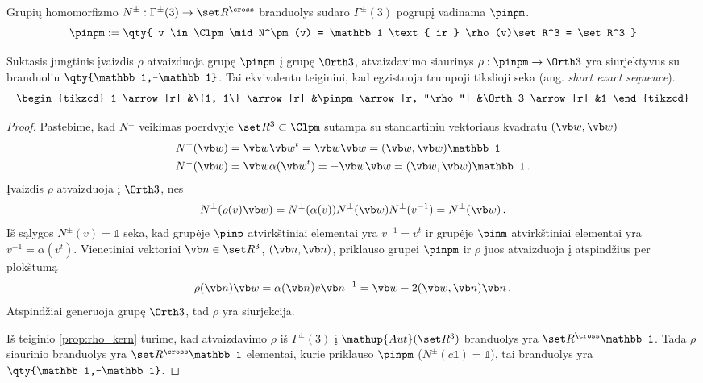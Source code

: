 \begin{definition}
	Grupių homomorfizmo $N^\pm:\Gamma^\pm(3) \to \set R^{\cross}$
	branduolys sudaro $\Gamma^\pm(3)$ pogrupį vadinama $\pinpm$.
	\begin{equation}
		\pinpm := \qty{
			v \in \Clpm 
			\mid 
			N^\pm(v) = \mathbb1
			\text{ ir }
			\rho(v)\set R^3 = \set R^3
		}
	\end{equation}
\end{definition}



\begin{proposition}
	\label{prop:pin_sequence}
	Suktasis jungtinis įvaizdis $\rho$ atvaizduoja grupę $\pinpm$ į grupę $\Orth3$,
	atvaizdavimo siaurinys $\rho:\pinpm\to\Orth3$ yra siurjektyvus
	su branduoliu $\qty{\mathbb1,-\mathbb1}$.
	Tai ekvivalentu teiginiui, kad egzistuoja trumpoji tikslioji seka
	(ang. \emph{short exact sequence}).
	\begin{equation}
		\begin{tikzcd}
			1 \arrow[r] &\{1,-1\} \arrow[r]	&\pinpm \arrow[r, "\rho"] &\Orth3 \arrow[r] &1
		\end{tikzcd}
	\end{equation}
\end{proposition}
\begin{proof}
	Pastebime, kad $N^\pm$ veikimas poerdvyje $\set R^3 \subset \Clpm$
	sutampa su standartiniu vektoriaus kvadratu $(\vb w, \vb w)$
	\begin{align}
		N^+ (\vb w) &= \vb w {\vb w}^t 
		= \vb w \vb w = (\vb w,\vb w)\mathbb1
		\\
		N^- (\vb w) &= \vb w \alpha({\vb w}^t) 
		= -\vb w \vb w = (\vb w,\vb w)\mathbb1
		\,.
	\end{align}
	Įvaizdis $\rho$ atvaizduoja į $\Orth3$, nes
	\begin{equation}
		N^\pm(\rho(v)\vb w)
		= N^\pm(\alpha(v))  N^\pm(\vb w)  N^\pm(v^{-1}) 
		= N^\pm(\vb w)
		\,.
	\end{equation}
	Iš sąlygos $N^\pm(v) = \mathbb1$ seka,
	kad grupėje $\pinp$ atvirkštiniai elementai yra $v^{-1} = v^t$
	ir grupėje $\pinm$ atvirkštiniai elementai yra $v^{-1} = \alpha(v^t)$.
	Vienetiniai vektoriai $\vb n \in \set R^3$, $(\vb n,\vb n)$, priklauso grupei $\pinpm$
	ir $\rho$ juos atvaizduoja į atspindžius per plokštumą
	\begin{equation}
		\rho(\vb n)\vb w = \alpha(\vb n) v \vb n^{-1} = \vb w - 2 (\vb w,\vb n)\vb n
		\,.
	\end{equation}
	Atspindžiai generuoja grupę $\Orth3$,
	tad $\rho$ yra siurjekcija.

	Iš teiginio \ref{prop:rho_kern} turime, kad atvaizdavimo 
	$\rho$ iš $\Gamma^\pm(3)$ į $\mathup{Aut}(\set R^3)$
	branduolys yra $\set R^{\cross} \mathbb1$.
	Tada $\rho$ siaurinio branduolys yra $\set R^{\cross} \mathbb1$
	elementai, kurie priklauso $\pinpm$ ($N^\pm(c\mathbb1) = \mathbb1$),
	tai branduolys yra $\qty{\mathbb1,-\mathbb1}$.
\end{proof}

